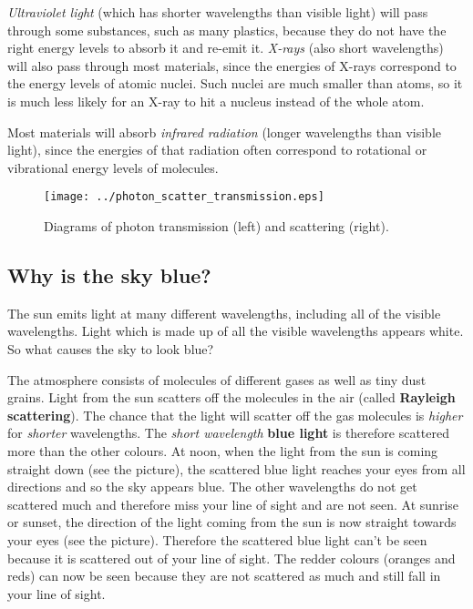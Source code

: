 \textit{Ultraviolet light} (which has shorter wavelengths than visible light) will pass through some substances, such as many plastics, because they do not have the right energy levels to absorb it and re-emit it. \textit{X-rays} (also short wavelengths) will also pass through most materials, since the energies of X-rays correspond to the energy levels of atomic nuclei.  Such nuclei are much smaller than atoms, so it is much less likely for an X-ray to hit a nucleus instead of the whole atom.

Most materials will absorb \textit{infrared radiation} (longer wavelengths than visible light), since the energies of that radiation often correspond to rotational or vibrational energy levels of molecules. 

\begin{figure}[!tb]
\begin{center}
\texttt{[image: ../photon\_scatter\_transmission.eps]}
\end{center}
\caption{Diagrams of photon transmission (left) and scattering (right).}
\label{transscatter}
\end{figure}

 
\subsection{Why is the sky blue?}
The sun emits light at many different wavelengths, including all of the visible wavelengths. Light which is made up of all the visible wavelengths appears white. So what causes the sky to look blue?

The atmosphere consists of molecules of different gases as well as tiny dust grains. Light from the sun scatters off the molecules in the air (called \textbf{Rayleigh scattering}).  
The chance that the light will scatter off the gas molecules is \textit{higher} for \textit{shorter} wavelengths.  The \textit{short wavelength} \textbf{blue light} is therefore scattered more than the other colours.  At noon, when the light from the sun is coming straight down (see the picture), the scattered blue light reaches your eyes from all directions and so the sky appears blue. The other wavelengths do not get scattered much and therefore miss your line of sight and are not seen. At sunrise or sunset, the direction of the light coming from the sun is now straight towards your eyes (see the picture). Therefore the scattered blue light can't be seen because it is scattered out of your line of sight. The redder colours (oranges and reds) can now be seen because they are not scattered as much and still fall in your line of sight. 
 


